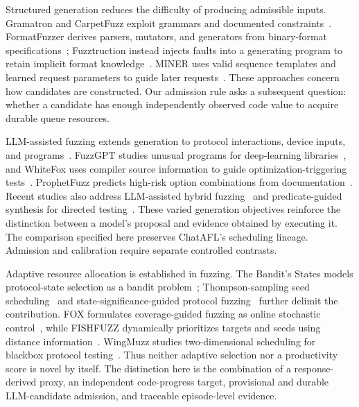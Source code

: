 \documentclass[final,5p,times,number]{elsarticle}
\begin{document}
Structured generation reduces the difficulty of producing admissible inputs. Gramatron and CarpetFuzz exploit grammars and documented constraints~\cite{gramatron_effective_grammar_aware_2021,carpetfuzz_documentation_2023}. FormatFuzzer derives parsers, mutators, and generators from binary-format specifications~\cite{formatfuzzer}; Fuzztruction instead injects faults into a generating program to retain implicit format knowledge~\cite{fuzztruction2023}. MINER uses valid sequence templates and learned request parameters to guide later requests~\cite{miner2023}. These approaches concern how candidates are constructed. Our admission rule asks a subsequent question: whether a candidate has enough independently observed code value to acquire durable queue resources.

LLM-assisted fuzzing extends generation to protocol interactions, device inputs, and programs~\cite{chatafl,llmif_augmented_large_language_2024,fuzz4all_universal_fuzzing_large_2024}. FuzzGPT studies unusual programs for deep-learning libraries~\cite{fuzzgpt2024}, and WhiteFox uses compiler source information to guide optimization-triggering tests~\cite{whitefox2024}. ProphetFuzz predicts high-risk option combinations from documentation~\cite{prophetfuzz2024}. Recent studies also address LLM-assisted hybrid fuzzing~\cite{hybridllm2026} and predicate-guided synthesis for directed testing~\cite{hgfuzzer2026}. These varied generation objectives reinforce the distinction between a model's proposal and evidence obtained by executing it. The comparison specified here preserves ChatAFL's scheduling lineage. Admission and calibration require separate controlled contrasts.

Adaptive resource allocation is established in fuzzing. The Bandit's States models protocol-state selection as a bandit problem~\cite{bandits_states2023}; Thompson-sampling seed scheduling~\cite{zhang2026thompson} and state-significance-guided protocol fuzzing~\cite{ssgfuzz2026} further delimit the contribution. FOX formulates coverage-guided fuzzing as online stochastic control~\cite{fox2024}, while FISHFUZZ dynamically prioritizes targets and seeds using distance information~\cite{fishfuzz2023}. WingMuzz studies two-dimensional scheduling for blackbox protocol testing~\cite{wingmuzz2025}. Thus neither adaptive selection nor a productivity score is novel by itself. The distinction here is the combination of a response-derived proxy, an independent code-progress target, provisional and durable LLM-candidate admission, and traceable episode-level evidence.
\end{document}
